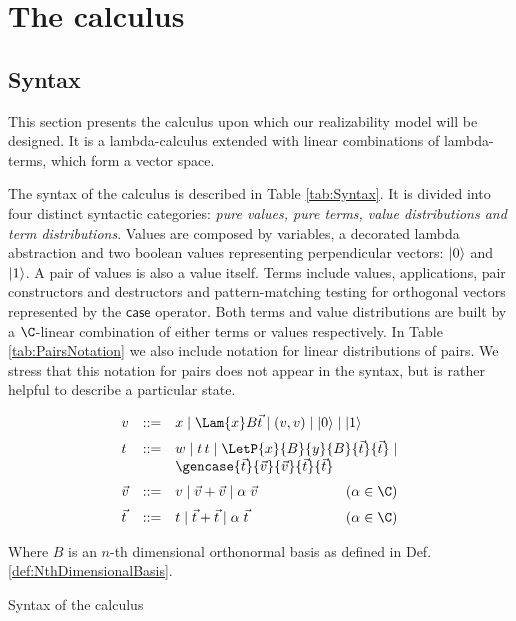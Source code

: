 \section{The calculus}\label{sec:calculus}
\subsection{Syntax}

This section presents the calculus upon which our realizability model will be designed. It is a lambda-calculus extended with linear combinations of lambda-terms, which form a vector space.

The syntax of the calculus is described in Table \ref{tab:Syntax}. It is divided into four distinct syntactic categories: \textit{pure values, pure terms, value distributions and term distributions}. Values are composed by variables, a decorated lambda abstraction and two boolean values representing perpendicular vectors: $\left\vert{0}\right\rangle$ and $\left\vert{1}\right\rangle$. A pair of values is also a value itself. Terms include values, applications, pair constructors and destructors and pattern-matching testing for orthogonal vectors represented by the $\mathsf{case}$ operator. Both terms and value distributions are built by a $\C$-linear combination of either terms or values respectively. In Table \ref{tab:PairsNotation} we also include notation for linear distributions of pairs. We stress that this notation for pairs does not appear in the syntax, but is rather helpful to describe a particular state.

\begin{table*}[t]
  \small
  \[\begin{array}{l@{\quad}rll@{}}
    v&::=& x \mid \Lam{x}B{\vec{t}} \mid (v, v) \mid\ket{0} \mid \ket{1} \\[6pt]
    t&::=& w \mid  t\,t \mid \LetP{x}{B}{y}{B}{\vec{t}}{\vec{t}} 
    \mid\\
    &&\gencase{\vec{t}}{\vec{v}}{\vec{v}}{\vec{t}}{\vec{t}}\\[6pt]
    \vec{v}&::=& v \mid \vec{v}+\vec{v} \mid 
    \alpha\;\vec{v}\qquad\hfill(\alpha\in\C)\\[6pt]
    \vec{t}&::=&
    t \mid \vec{t}+\vec{t} \mid 
    \alpha\;\vec{t}\qquad\hfill(\alpha\in\C)
   \end{array}
  \]
   
  Where $B$ is an $n$-th dimensional orthonormal basis as defined in Def. \ref{def:NthDimensionalBasis}.

  \caption{Syntax of the calculus}
  \label{tab:Syntax}
\end{table*}


